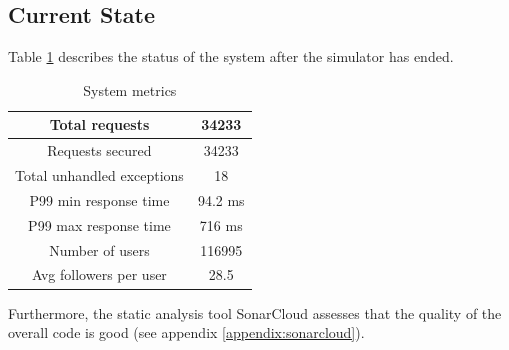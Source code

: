 \subsection{Current State}
Table \ref{current-table} describes the status of the system after the simulator has ended.
\begin{table}[H]
    \begin{center}
        \begin{tabular}{ |c|c| }
            \hline
            Total requests & 34233 \\
            \hline
            Requests secured & 34233 \\
            \hline
            Total unhandled exceptions & 18 \\
            \hline
            P99 min response time & 94.2 ms \\
            \hline
            P99 max response time & 716 ms \\
            \hline
            Number of users &  116995\\
            \hline
            Avg followers per user &  28.5\\
            \hline
        \end{tabular}
    \end{center}
    \caption{System metrics}
    \label{current-table}
\end{table}
Furthermore, the static analysis tool SonarCloud assesses that the quality of the overall code is good (see appendix \ref{appendix:sonarcloud}).
